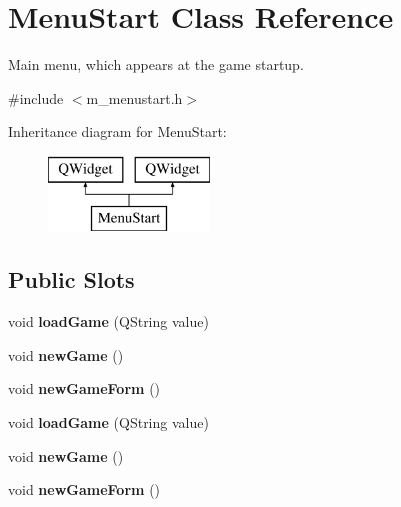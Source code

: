 \hypertarget{class_menu_start}{}\section{Menu\+Start Class Reference}
\label{class_menu_start}


Main menu, which appears at the game startup.  




{\ttfamily \#include $<$m\+\_\+menustart.\+h$>$}

Inheritance diagram for Menu\+Start\+:\begin{figure}[H]
\begin{center}
\leavevmode
\includegraphics[height=2.000000cm]{class_menu_start}
\end{center}
\end{figure}
\subsection*{Public Slots}
\begin{DoxyCompactItemize}
\item 
\hypertarget{class_menu_start_a8af8ec946e4b575852937b469bfe3d59}{}void {\bfseries load\+Game} (Q\+String value)\label{class_menu_start_a8af8ec946e4b575852937b469bfe3d59}

\item 
\hypertarget{class_menu_start_a3ebce084546f1f9374a2e1cd0378d17a}{}void {\bfseries new\+Game} ()\label{class_menu_start_a3ebce084546f1f9374a2e1cd0378d17a}

\item 
\hypertarget{class_menu_start_a27892e476830d761fae92cc8b7db323f}{}void {\bfseries new\+Game\+Form} ()\label{class_menu_start_a27892e476830d761fae92cc8b7db323f}

\item 
\hypertarget{class_menu_start_a8af8ec946e4b575852937b469bfe3d59}{}void {\bfseries load\+Game} (Q\+String value)\label{class_menu_start_a8af8ec946e4b575852937b469bfe3d59}

\item 
\hypertarget{class_menu_start_a3ebce084546f1f9374a2e1cd0378d17a}{}void {\bfseries new\+Game} ()\label{class_menu_start_a3ebce084546f1f9374a2e1cd0378d17a}

\item 
\hypertarget{class_menu_start_a27892e476830d761fae92cc8b7db323f}{}void {\bfseries new\+Game\+Form} ()\label{class_menu_start_a27892e476830d761fae92cc8b7db323f}

\end{DoxyCompactItemize}
